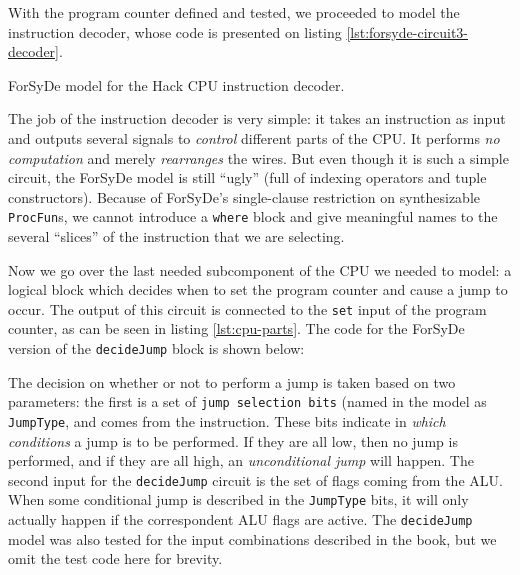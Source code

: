 \documentclass[a4paper]{article}
\begin{document}
                With the program counter defined and tested, we proceeded to model the instruction
                decoder, whose code is presented on listing \ref{lst:forsyde-circuit3-decoder}.

                \begin{listing}[h!]
                    \caption{ForSyDe model for the Hack CPU instruction decoder.
                        \label{lst:forsyde-circuit3-decoder}}
                \end{listing}

                The job of the instruction decoder is very simple: it takes an instruction as input
                and outputs several signals to \emph{control} different parts of the CPU. It
                performs \emph{no computation} and merely \emph{rearranges} the wires. But even
                though it is such a simple circuit, the ForSyDe model is still ``ugly'' (full of
                indexing operators and tuple constructors). Because of ForSyDe's single-clause
                restriction on synthesizable \texttt{ProcFun}s, we cannot introduce a \texttt{where}
                block and give meaningful names to
                the several ``slices'' of the instruction that we are selecting.

                Now we go over the last needed subcomponent of the CPU we needed to model: a logical
                block which decides when to set the program counter and cause a jump to occur. The
                output of this circuit is connected to the \texttt{set} input of the program
                counter, as can be seen in listing \ref{lst:cpu-parts}. The code for the ForSyDe
                version of the \texttt{decideJump} block is shown below:


                The decision on whether or not to perform a jump is taken based on two parameters:
                the first is a set of \texttt{jump selection bits} (named in the model as
                \texttt{JumpType}, and comes from the instruction. These bits indicate in
                \emph{which conditions} a jump is to be performed. If they are all low, then no jump
                is performed, and if they are all high, an \emph{unconditional jump} will happen.
                The second input for the \texttt{decideJump} circuit is the set of flags coming from
                the ALU. When some conditional jump is described in the \texttt{JumpType} bits, it
                will only actually happen if the correspondent ALU flags are active. The
                \texttt{decideJump} model was also tested for the input combinations described in
                the book\cite{nand2tetris-book}, but we omit the test code here for brevity.
\end{document}
